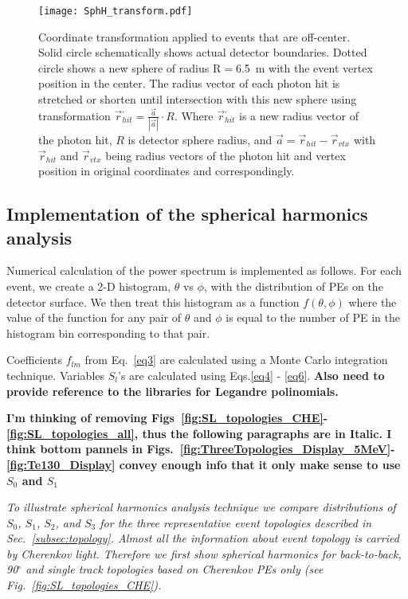 \begin{figure*}[h]
  \centering
  \texttt{[image: SphH\_transform.pdf]}
  \caption{Coordinate transformation applied to events that are
    off-center. Solid circle schematically shows actual detector
    boundaries. Dotted circle shows a new sphere of radius R$=$6.5~m
    with the event vertex position in the center. The radius vector of
    each photon hit is stretched or shorten until intersection with
    this new sphere using transformation $\vec{r}^{,}_{hit} =
    \frac{\vec{a}}{|\vec{a}|} \cdot R$. Where $\vec{r}^{,}_{hit}$ is a
    new radius vector of the photon hit, $R$ is detector sphere radius,
    and $\vec{a}=\vec{r}_{hit} - \vec{r}_{vtx}$ with $\vec{r}_{hit}$
    and $\vec{r}_{vtx}$ being radius vectors of the photon hit and
    vertex position in original coordinates and correspondingly.}
  \label{fig:SphH_transform}
\end{figure*}


\subsection{Implementation of the spherical harmonics analysis}

Numerical calculation of the power spectrum is implemented as follows.
For each event, we create a 2-D histogram, $\theta$ vs $\phi$, with the distribution of PEs on the detector surface. We then treat this 
histogram as a function $f(\theta,\phi)$ where the value of the function for any pair of $\theta$ and $\phi$ is equal to the number of 
PE in the histogram bin corresponding to that pair.

Coefficients $f_{lm}$ from Eq.~\ref{eq3} are calculated using a Monte Carlo integration technique. Variables $S_l$'s are calculated using 
Eqs.\ref{eq4} - \ref{eq6}. {\bf Also need to provide reference to the libraries for Legandre polinomials.}

\textbf{ I'm thinking of removing Figs~\ref{fig:SL_topologies_CHE}-\ref{fig:SL_topologies_all}, thus the following paragraphs are in Italic. 
I think bottom pannels in Figs.~\ref{fig:ThreeTopologies_Display_5MeV}-\ref{fig:Te130_Display} convey enough info that it only make sense to use
$S_0$ and $S_1$}

\begingroup
  \itshape
To illustrate spherical harmonics analysis technique we compare distributions of $S_0$, $S_1$, $S_2$, and $S_3$ for the three representative event topologies described in Sec.~\ref{subsec:topology}. Almost all the information about event topology is carried by Cherenkov light. Therefore we first show spherical harmonics for back-to-back,  90$^{\circ}$ and single track topologies based on Cherenkov PEs only (see Fig.~\ref{fig:SL_topologies_CHE}).

